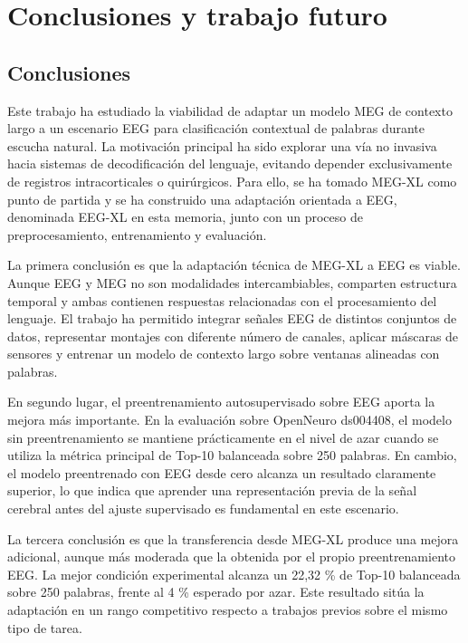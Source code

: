 
\chapter{Conclusiones y trabajo futuro}

\section{Conclusiones}

Este trabajo ha estudiado la viabilidad de adaptar un modelo MEG de contexto largo a un escenario EEG para clasificación contextual de palabras durante escucha natural. La motivación principal ha sido explorar una vía no invasiva hacia sistemas de decodificación del lenguaje, evitando depender exclusivamente de registros intracorticales o quirúrgicos. Para ello, se ha tomado MEG-XL como punto de partida y se ha construido una adaptación orientada a EEG, denominada EEG-XL en esta memoria, junto con un proceso de preprocesamiento, entrenamiento y evaluación.

La primera conclusión es que la adaptación técnica de MEG-XL a EEG es viable. Aunque EEG y MEG no son modalidades intercambiables, comparten estructura temporal y ambas contienen respuestas relacionadas con el procesamiento del lenguaje. El trabajo ha permitido integrar señales EEG de distintos conjuntos de datos, representar montajes con diferente número de canales, aplicar máscaras de sensores y entrenar un modelo de contexto largo sobre ventanas alineadas con palabras.

En segundo lugar, el preentrenamiento autosupervisado sobre EEG aporta la mejora más importante. En la evaluación sobre OpenNeuro ds004408, el modelo sin preentrenamiento se mantiene prácticamente en el nivel de azar cuando se utiliza la métrica principal de Top-10 balanceada sobre 250 palabras. En cambio, el modelo preentrenado con EEG desde cero alcanza un resultado claramente superior, lo que indica que aprender una representación previa de la señal cerebral antes del ajuste supervisado es fundamental en este escenario.

La tercera conclusión es que la transferencia desde MEG-XL produce una mejora adicional, aunque más moderada que la obtenida por el propio preentrenamiento EEG. La mejor condición experimental alcanza un 22,32 \% de Top-10 balanceada sobre 250 palabras, frente al 4 \% esperado por azar. Este resultado sitúa la adaptación en un rango competitivo respecto a trabajos previos sobre el mismo tipo de tarea.

